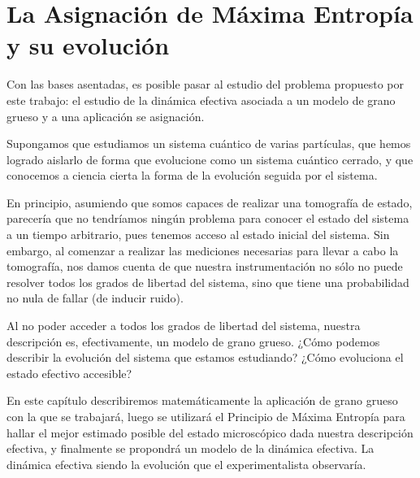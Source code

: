 \chapter{La Asignación de Máxima Entropía y su evolución}


Con las bases asentadas, es posible pasar al estudio del problema propuesto por este trabajo: el estudio de la dinámica efectiva asociada a un modelo de grano grueso y a una aplicación se asignación.

Supongamos que estudiamos un sistema cuántico de varias partículas, que hemos logrado aislarlo de forma que evolucione como un sistema cuántico cerrado, y que conocemos a ciencia cierta la forma de la evolución seguida por el sistema.

En principio, asumiendo que somos capaces de realizar una tomografía de estado, parecería que no tendríamos ningún problema para conocer el estado del sistema a un tiempo arbitrario, pues tenemos acceso al estado inicial del sistema. Sin embargo, al comenzar a realizar las mediciones necesarias para llevar a cabo la tomografía, nos damos cuenta de que nuestra instrumentación no sólo no puede resolver todos los grados de libertad del sistema, sino que tiene una probabilidad no nula de fallar (de inducir ruido).

Al no poder acceder a todos los grados de libertad del sistema, nuestra descripción es, efectivamente, un modelo de grano grueso. ¿Cómo podemos describir la evolución del sistema que estamos estudiando? ¿Cómo evoluciona el estado efectivo accesible?

En este capítulo describiremos matemáticamente la aplicación de grano grueso con la que se trabajará, luego se utilizará el Principio de Máxima Entropía para hallar el mejor \acnote{\checkmark} estimado posible del estado microscópico dada nuestra descripción efectiva, y finalmente se propondrá un modelo de la dinámica efectiva. La dinámica efectiva siendo la evolución que el experimentalista observaría.





\newpage
